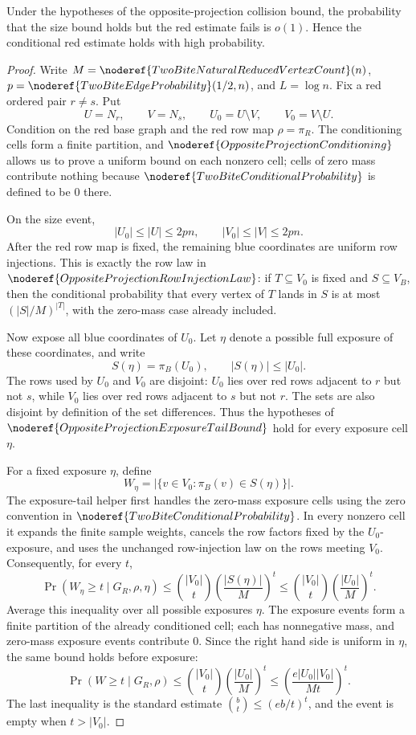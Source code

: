 \begin{lemma}
Under the hypotheses of the opposite-projection collision bound, the probability that the size bound holds but the red estimate fails is $o(1)$. Hence the conditional red estimate holds with high probability.
\end{lemma}
\begin{proof}
Write \(M=\noderef{TwoBiteNaturalReducedVertexCount}(n)\),
\(p=\noderef{TwoBiteEdgeProbability}(1/2,n)\), and \(L=\log n\).  Fix a
red ordered pair \(r\ne s\).  Put
\[
U=N_r,\qquad V=N_s,\qquad U_0=U\setminus V,\qquad V_0=V\setminus U.
\]
Condition on the red base graph and the red row map \(\rho=\pi_R\).  The
conditioning cells form a finite partition, and
\(\noderef{OppositeProjectionConditioning}\) allows us to prove a uniform
bound on each nonzero cell; cells of zero mass contribute nothing because
\(\noderef{TwoBiteConditionalProbability}\) is defined to be \(0\) there.

On the size event,
\[
|U_0|\le |U|\le 2pn,\qquad |V_0|\le |V|\le 2pn.
\]
After the red row map is fixed, the remaining blue coordinates are uniform
row injections.  This is exactly the row law in
\(\noderef{OppositeProjectionRowInjectionLaw}\): if \(T\subseteq V_0\) is
fixed and \(S\subseteq V_B\), then the conditional probability that every
vertex of \(T\) lands in \(S\) is at most \((|S|/M)^{|T|}\), with the
zero-mass case already included.

Now expose all blue coordinates of \(U_0\).  Let \(\eta\) denote a possible
full exposure of these coordinates, and write
\[
S(\eta)=\pi_B(U_0),\qquad |S(\eta)|\le |U_0|.
\]
The rows used by \(U_0\) and \(V_0\) are disjoint: \(U_0\) lies over red
rows adjacent to \(r\) but not \(s\), while \(V_0\) lies over red rows
adjacent to \(s\) but not \(r\).  The sets are also disjoint by definition of
the set differences.  Thus the hypotheses of
\(\noderef{OppositeProjectionExposureTailBound}\) hold for every exposure
cell \(\eta\).

For a fixed exposure \(\eta\), define
\[
W_\eta=|\{v\in V_0:\pi_B(v)\in S(\eta)\}|.
\]
The exposure-tail helper first handles the zero-mass exposure cells using the
zero convention in \(\noderef{TwoBiteConditionalProbability}\).  In every
nonzero cell it expands the finite sample weights, cancels the row factors
fixed by the \(U_0\)-exposure, and uses the unchanged row-injection law on
the rows meeting \(V_0\).  Consequently, for every \(t\),
\[
\Pr(W_\eta\ge t\mid G_R,\rho,\eta)
\le \binom{|V_0|}{t}\left(\frac{|S(\eta)|}{M}\right)^t
\le \binom{|V_0|}{t}\left(\frac{|U_0|}{M}\right)^t .
\]
Average this inequality over all possible exposures \(\eta\).  The exposure
events form a finite partition of the already conditioned cell; each has
nonnegative mass, and zero-mass exposure events contribute \(0\).  Since the
right hand side is uniform in \(\eta\), the same bound holds before exposure:
\[
\Pr(W\ge t\mid G_R,\rho)
\le \binom{|V_0|}{t}\left(\frac{|U_0|}{M}\right)^t
\le \left(\frac{e|U_0||V_0|}{Mt}\right)^t.
\]
The last inequality is the standard estimate
\(\binom bt\le(eb/t)^t\), and the event is empty when \(t>|V_0|\).


\end{proof}
